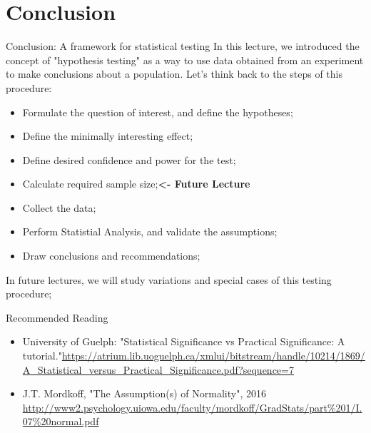 \section{Conclusion}

\begin{frame}{Conclusion: A framework for statistical testing}
  In this lecture, we introduced the concept of "hypothesis testing" as a way to use data obtained from an experiment to make conclusions about a population. Let's think back to the steps of this procedure:
  \bigskip

  \begin{itemize}
    \item Formulate the question of interest, and define the hypotheses;
    \item Define the minimally interesting effect;
    \item Define desired confidence and power for the test;
    \item Calculate required sample size;\hfill {\bf <- Future Lecture}
    \item Collect the data;
    \item Perform Statistial Analysis, and validate the assumptions;
    \item Draw conclusions and recommendations;
  \end{itemize}
  \bigskip

  In future lectures, we will study variations and special cases of this testing procedure;
\end{frame}

\begin{frame}{Recommended Reading}

  \begin{itemize}
    \item University of Guelph: "Statistical Significance vs Practical Significance: A tutorial."\url{https://atrium.lib.uoguelph.ca/xmlui/bitstream/handle/10214/1869/A_Statistical_versus_Practical_Significance.pdf?sequence=7}

    \item J.T. Mordkoff, "The Assumption(s) of Normality", 2016 \url{http://www2.psychology.uiowa.edu/faculty/mordkoff/GradStats/part\%201/I.07\%20normal.pdf}
  \end{itemize}

\end{frame}

